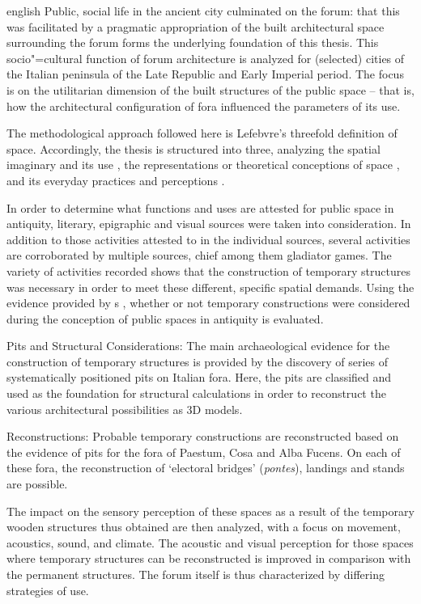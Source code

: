 \begin{foreignlanguage}{english}
Public, social life in the ancient city culminated on the forum: that this was facilitated by a pragmatic appropriation of the built architectural space surrounding the forum forms the underlying foundation of this thesis. This socio"=cultural function of forum architecture is analyzed for (selected) cities of the Italian peninsula of the Late Republic and Early Imperial period. The focus is on the utilitarian dimension of the built structures of the public space – that is, how the architectural configuration of fora influenced the parameters of its use.

The methodological approach followed here is Lefebvre’s threefold definition of space.
Accordingly, the thesis is structured into three, analyzing the spatial imaginary and its use ,
the representations or theoretical conceptions of space ,
and its everyday practices and perceptions .

In order to determine what functions and uses are attested for public space in antiquity, literary, epigraphic and visual sources were taken into consideration. In addition to those activities attested to in the individual sources, several activities are corroborated by multiple sources, chief among them gladiator games. The variety of activities recorded shows that the construction of temporary structures was necessary in order to meet these different, specific spatial demands.
Using the evidence provided by \citeauthor{Vitr}s , whether or not temporary constructions were considered during the conception of public spaces in antiquity is evaluated.

Pits and Structural Considerations:
The main archaeological evidence for the construction of temporary structures is provided by the discovery of series of systematically positioned pits on Italian fora. Here, the pits are classified and used as the foundation for structural calculations in order to reconstruct the various architectural possibilities as 3D models.

Reconstructions:
Probable temporary constructions are reconstructed based on the evidence of pits for the fora of Paestum, Cosa and Alba Fucens. On each of these fora, the reconstruction of \enquote*{electoral bridges} (\emph{pontes}), landings and stands are possible.

The impact on the sensory perception of these spaces as a result of the temporary wooden structures thus obtained are then analyzed, with a focus on movement, acoustics, sound, and climate. The acoustic and visual perception for those spaces where temporary structures can be reconstructed is improved in comparison with the permanent structures. The forum itself is thus characterized by differing strategies of use.


\end{foreignlanguage}
